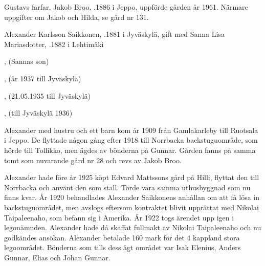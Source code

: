 %
Gustavs farfar, Jakob Broo, .1886 i Jeppo, uppförde gården år 1961. Närmare uppgifter om Jakob och Hilda, se gård nr 131.


%


%
Alexander Karlsson Saikkonen, .1881 i Jyväskylä, gift med Sanna Lisa Mariasdotter, .1882 i Lehtimäki
\begin{jhchildren}
  \item {}, (Sannas son)
  \item {}
  \item {}, (år 1937 till Jyväskylä)
  \item {}
  \item {}
  \item {}, (21.05.1935 till Jyväskylä)
  \item {}, (till Jyväskylä 1936)
\end{jhchildren}

Alexander med hustru och ett barn kom år 1909 från Gamlakarleby till Ruotsala i Jeppo. De flyttade någon gång efter 1918 till Norrbacka backstuguområde, som hörde till Tollikko, men ägdes av bönderna på Gunnar. Gården fanns på samma tomt som nuvarande gård nr 28 och revs av Jakob Broo.

Alexander hade före år 1925 köpt Edvard Mattssons gård på Hilli, flyttat den till Norrbacka och använt den som stall. Torde vara samma uthusbyggnad som nu finns kvar. År 1920 behandlades Alexander Saikkonens anhållan om att få lösa in backstuguområdet, men avslogs eftersom kontraktet blivit upprättat med Nikolai Taipaleenaho, som befann sig i Amerika. År 1922 togs ärendet upp igen i legonämnden. Alexander hade då skaffat fullmakt av Nikolai Taipaleenaho och nu godkändes ansökan. Alexander betalade 160 mark för det 4 kappland stora legoområdet. Bönderna som tills dess ägt området var Isak Elenius, Anders Gunnar, Elias och Johan Gunnar.

